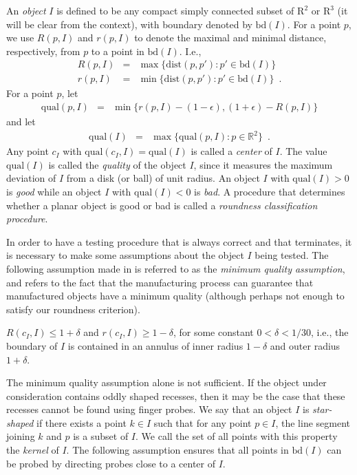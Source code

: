 \documentclass[11pt]{article}
\newcommand{\bd}{\mathrm{bd}}
\newcommand{\dist}{\mathrm{dist}}
\newcommand{\qual}{\mathrm{qual}}
\begin{document}
An \emph{object} $I$ is defined to be any compact simply connected
subset of $\mathrm{R}^2$ or $\mathrm{R^3}$ (it will be clear from the
context), with boundary denoted by $\bd(I)$.  For a point $p$, we use
$R(p,I)$ and $r(p,I)$ to denote the maximal and minimal distance,
respectively, from $p$ to a point in $\bd(I)$. I.e.,
\begin{eqnarray} 
R(p,I) &=& \max\{\dist(p,p'):p'\in\bd(I)\} \\ 
r(p,I) &=& \min\{\dist(p,p'):p'\in\bd(I)\} \enspace . 
\end{eqnarray}
For a point $p$, let
\begin{eqnarray}
\qual(p,I) & = & \min\{r(p,I)-(1-\epsilon), (1+\epsilon)-R(p,I)\} 
\end{eqnarray}
and let
\begin{eqnarray}
\qual(I)  &=& \max\{\qual(p, I):p\in\mathbb{R}^2\} \enspace .
\end{eqnarray}
Any point $c_I$ with $\qual(c_I,I)=\qual(I)$ is called a \emph{center}
of $I$.  The value $\qual(I)$ is called the \emph{quality} of the
object $I$, since it measures the maximum deviation of $I$ from a disk
(or ball) of unit radius.  An object $I$ with $\qual(I)>0$ is {\em
good} while an object $I$ with $\qual(I)<0$ is \emph{bad}.  A procedure
that determines whether a planar object is good or bad is called a
\emph{roundness classification procedure}.

In order to have a testing procedure that is always correct and that
terminates, it is necessary to make some assumptions about the object
$I$ being tested.  The following assumption made in \cite{msy97,sy95} is
referred to as the \emph{minimum quality assumption}, and refers to the
fact that the manufacturing process can guarantee that manufactured
objects have a minimum quality (although perhaps not enough to satisfy
our roundness criterion).

\begin{ass}
$R(c_I,I)\le 1+\delta$ and $r(c_I,I)\ge 1-\delta$, for some constant
$0<\delta<1/30$, i.e., the boundary of $I$ is contained in an annulus
of inner radius $1-\delta$ and outer radius $1+\delta$.  
\end{ass}

The minimum quality assumption alone is not sufficient.  If the object
under consideration contains oddly shaped recesses, then it may be the
case that these recesses cannot be found using finger probes.  We say
that an object $I$ is \emph{star-shaped} if there exists a point $k\in
I$ such that for any point $p\in I$, the line segment joining $k$ and
$p$ is a subset of $I$.  We call the set of all points with this
property the \emph{kernel} of $I$.  The following assumption ensures
that all points in $\bd(I)$ can be probed by directing probes close to
a center of $I$.
\end{document}
